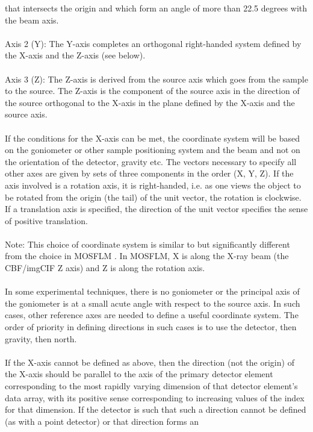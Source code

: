 \documentclass[11pt]{article}
\begin{document}
{that intersects the origin and which form an angle of more than 22.5
degrees with the beam axis.\\
~~\\
Axis 2 (Y): The Y-axis completes an orthogonal right-handed system
defined by the X-axis and the Z-axis (see below).\\
~~\\
Axis 3 (Z): The Z-axis is derived from the source axis which goes from
the sample to the source.  The Z-axis is the component of the source axis
in the direction of the source orthogonal to the X-axis in the plane
defined by the X-axis and the source axis.\\
~~\\
If the conditions for the X-axis can be met, the coordinate system
will be based on the goniometer or other sample positioning system
and the beam and not on the orientation of the detector, gravity etc.  
The vectors necessary to specify all other axes are given by sets of
three components in the order (X, Y, Z).
If the axis involved is a rotation axis, it is right-handed, i.e. as
one views the object to be rotated from the origin (the tail) of the
unit vector, the rotation is clockwise.  If a translation axis is
specified, the direction of the unit vector specifies the sense of
positive translation.\\
~~\\
Note:  This choice of coordinate system is similar to but significantly
different from the choice in MOSFLM \cite{leslie2007processing}.  In MOSFLM,
X is along the X-ray beam (the CBF/imgCIF Z axis) and Z is along the
rotation axis.\\
~~\\
In some experimental techniques, there is no goniometer or the principal
axis of the goniometer is at a small acute angle with respect to
the source axis.  In such cases, other reference axes are needed
to define a useful coordinate system.  The order of priority in
defining directions in such cases is to use the detector, then
gravity, then north.\\
~~\\
If the X-axis cannot be defined as above, then the
direction (not the origin) of the X-axis should be parallel to the axis
of the primary detector element corresponding to the most rapidly
varying dimension of that detector element's data array, with its
positive sense corresponding to increasing values of the index for
that dimension.  If the detector is such that such a direction cannot
be defined (as with a point detector) or that direction forms an
}
\end{document}
